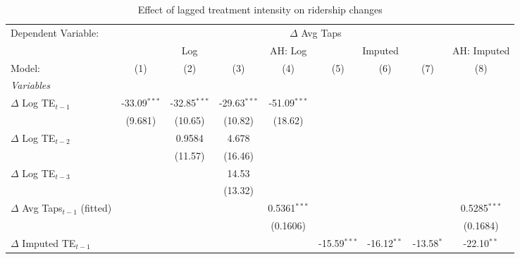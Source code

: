
\begin{table}[htbp]
   \caption{\label{tab:behaviour_results} Effect of lagged treatment intensity on ridership changes}
   \centering
   \footnotesize
   \begin{tabular}{lcccccccc}
      \tabularnewline \midrule \midrule
      Dependent Variable: & \multicolumn{8}{c}{$\Delta$ Avg Taps}\\
       & \multicolumn{3}{c}{Log} & AH: Log & \multicolumn{3}{c}{Imputed} & AH: Imputed \\ 
      Model:                                      & (1)            & (2)            & (3)            & (4)            & (5)            & (6)           & (7)          & (8)\\  
      \midrule
      \emph{Variables}\\
      $\Delta$ Log TE$_{t-1}$                     & -33.09$^{***}$ & -32.85$^{***}$ & -29.63$^{***}$ & -51.09$^{***}$ &                &               &              &   \\   
                                                  & (9.681)        & (10.65)        & (10.82)        & (18.62)        &                &               &              &   \\   
      $\Delta$ Log TE$_{t-2}$                     &                & 0.9584         & 4.678          &                &                &               &              &   \\   
                                                  &                & (11.57)        & (16.46)        &                &                &               &              &   \\   
      $\Delta$ Log TE$_{t-3}$                     &                &                & 14.53          &                &                &               &              &   \\   
                                                  &                &                & (13.32)        &                &                &               &              &   \\   
      $\Delta$ Avg Taps$_{t-1}$ (fitted)          &                &                &                & 0.5361$^{***}$ &                &               &              & 0.5285$^{***}$\\   
                                                  &                &                &                & (0.1606)       &                &               &              & (0.1684)\\   
      $\Delta$ Imputed TE$_{t-1}$                 &                &                &                &                & -15.59$^{***}$ & -16.12$^{**}$ & -13.58$^{*}$ & -22.10$^{**}$\\   

\end{tabular}
\end{table}
